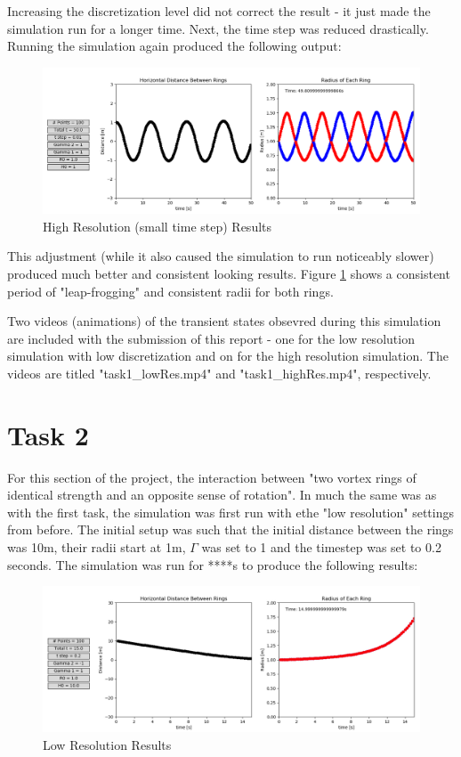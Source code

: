 \documentclass[10pt]{article}
\begin{document}
Increasing the discretization level did not correct the result - it just made the simulation run for a longer time. Next, the time step was reduced drastically. Running the simulation again produced the following output:


\begin{figure}[H]
   \centering
   \includegraphics[width=1\linewidth]{figures/task1_fine.png}
   \caption{High Resolution (small time step) Results}
   \label{task1_fine}
\end{figure}


This adjustment (while it also caused the simulation to run noticeably slower) produced much better and consistent looking results. Figure \ref{task1_fine} shows a consistent period of "leap-frogging" and consistent radii for both rings.


Two videos (animations) of the transient states obsevred during this simulation are included with the submission of this report - one for the low resolution simulation with low discretization and on for the high resolution simulation. The videos are titled "task1\_lowRes.mp4" and "task1\_highRes.mp4", respectively.



\section{Task 2}

For this section of the project, the interaction between "two vortex rings of identical strength and an opposite sense of rotation". In much the same was as with the first task, the simulation was first run with ethe "low resolution" settings from before. The initial setup was such that the initial distance between the rings was 10m, their radii start at 1m, $\Gamma$ was set to 1 and the timestep was set to 0.2 seconds. The simulation was run for ****s to produce the following results:

\begin{figure}[H]
   \centering
   \includegraphics[width=1\linewidth]{figures/task2_coarse.png}
   \caption{Low Resolution Results}
   \label{task2_coarse}
\end{figure}
\end{document}
